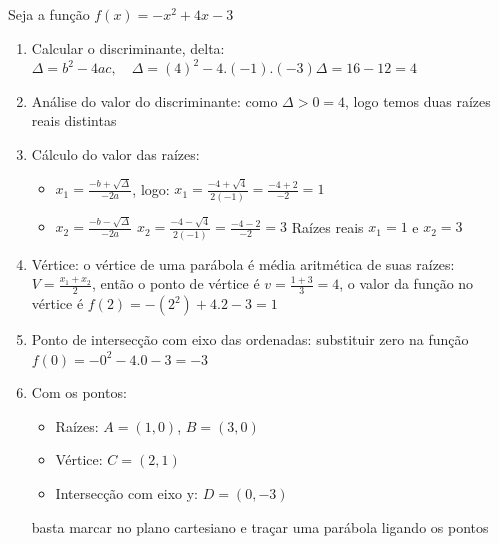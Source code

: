 \begin{multicols*}{2}
    Seja a função $f(x) = -x^2 + 4x -3$
    \begin{enumerate}[wide, labelwidth=!, labelindent=0pt]
        \item Calcular o discriminante, delta: $\Delta = b^2 - 4ac, \quad \Delta = (4)^2 - 4.(-1).(-3)
                  \Delta = 16 - 12 = 4$
        \item Análise do valor do discriminante: como $\Delta > 0 = 4$, logo temos duas raízes reais 			distintas
        \item Cálculo do valor das raízes:
              \begin{itemize}
                  \item $x_1 = \frac{-b + \sqrt{\Delta} }{-2a}$, logo:
                        $x_1 = \frac{-4 + \sqrt{4}}{2(-1)} = \frac{ - 4 +2}{-2} = 1$
                  \item $x_2 = \frac{-b - \sqrt{\Delta} }{-2a}$
                        $x_2 = \frac{-4 - \sqrt{4}}{2(-1)} = \frac{ - 4  -2}{-2} = 3$
                        Raízes reais $x_1 = 1$ e $x_2 = 3$
              \end{itemize}
        \item Vértice: o vértice de uma parábola é média aritmética de suas raízes:
              $V = \frac{x_1 +x_2}{2}$, então o ponto de vértice é $v = \frac{1+3}{3} = 4$, o valor da função 		no vértice é $f(2) = -(2^2) + 4.2 -3 = 1$
        \item Ponto de intersecção com eixo das ordenadas: substituir zero na função $f(0) = -0^2 -4.0 			-3 = -3$
        \item Com os pontos:
              \begin{itemize}
                  \item Raízes: $A = (1,0)$, $B = (3,0)$
                  \item Vértice: $C = (2,1)$
                  \item Intersecção com eixo y: $D =  (0,-3)$
              \end{itemize}
              basta marcar no plano cartesiano e traçar uma parábola ligando os pontos


\end{enumerate}
\end{multicols*}
